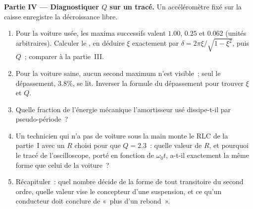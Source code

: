 \begin{problem}
\medskip
\noindent\textbf{Partie IV --- Diagnostiquer $Q$ sur un tracé.}
Un accéléromètre fixé sur la caisse enregistre la décroissance libre.
\begin{enumerate}[resume]
  \item Pour la voiture usée, les maxima successifs valent $1.00$, $0.25$
        et $0.062$ (unités arbitraires). Calculer le , en déduire $\xi$ exactement par
        $\delta = 2\pi\xi/\sqrt{1 - \xi^2}$, puis $Q$~; comparer à la
        partie~III.
  \item Pour la voiture saine, aucun second maximum n'est visible~; seul
        le dépassement, $3.8\%$, se lit. Inverser la formule du
        dépassement pour trouver $\xi$ et $Q$.
  \item Quelle fraction de l'énergie mécanique l'amortisseur usé
        dissipe-t-il par pseudo-période~?
  \item Un technicien qui n'a pas de voiture sous la main monte le RLC
        de la partie~I avec un $R$ choisi pour que $Q = 2.3$~: quelle
        valeur de $R$, et pourquoi le tracé de l'oscilloscope, porté en
        fonction de $\omega_0 t$, a-t-il exactement la même forme que
        celui de la voiture~?
  \item Récapituler~: quel nombre  décide de la forme de
        tout transitoire du second ordre, quelle valeur vise le
        concepteur d'une suspension, et ce qu'un conducteur doit
        conclure de «~plus d'un rebond~».
\end{enumerate}
\end{problem}
